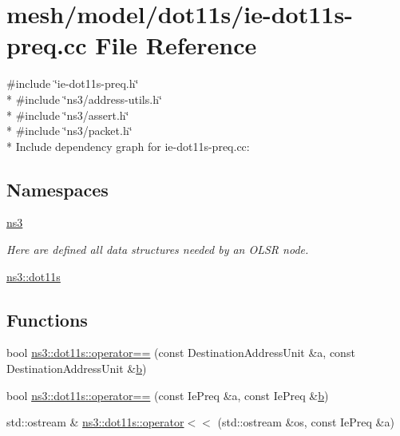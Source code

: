 \hypertarget{ie-dot11s-preq_8cc}{}\section{mesh/model/dot11s/ie-\/dot11s-\/preq.cc File Reference}
\label{ie-dot11s-preq_8cc}
{\ttfamily \#include \char`\"{}ie-\/dot11s-\/preq.\+h\char`\"{}}\\*
{\ttfamily \#include \char`\"{}ns3/address-\/utils.\+h\char`\"{}}\\*
{\ttfamily \#include \char`\"{}ns3/assert.\+h\char`\"{}}\\*
{\ttfamily \#include \char`\"{}ns3/packet.\+h\char`\"{}}\\*
Include dependency graph for ie-\/dot11s-\/preq.cc\+:
\subsection*{Namespaces}
\begin{DoxyCompactItemize}
\item 
 \hyperlink{namespacens3}{ns3}
\begin{DoxyCompactList}\small\item\em Here are defined all data structures needed by an O\+L\+SR node. \end{DoxyCompactList}\item 
 \hyperlink{namespacens3_1_1dot11s}{ns3\+::dot11s}
\end{DoxyCompactItemize}
\subsection*{Functions}
\begin{DoxyCompactItemize}
\item 
bool \hyperlink{namespacens3_1_1dot11s_a136414d52b2511da5e24c811cc8ded62}{ns3\+::dot11s\+::operator==} (const Destination\+Address\+Unit \&a, const Destination\+Address\+Unit \&\hyperlink{lte__pathloss_8m_a21ad0bd836b90d08f4cf640b4c298e7c}{b})
\item 
bool \hyperlink{namespacens3_1_1dot11s_abd1a7ef48675b476f64073fd1555d277}{ns3\+::dot11s\+::operator==} (const Ie\+Preq \&a, const Ie\+Preq \&\hyperlink{lte__pathloss_8m_a21ad0bd836b90d08f4cf640b4c298e7c}{b})
\item 
std\+::ostream \& \hyperlink{namespacens3_1_1dot11s_a538df889b845ab6e5b2cd9d61a45f33d}{ns3\+::dot11s\+::operator$<$$<$} (std\+::ostream \&os, const Ie\+Preq \&a)
\end{DoxyCompactItemize}
